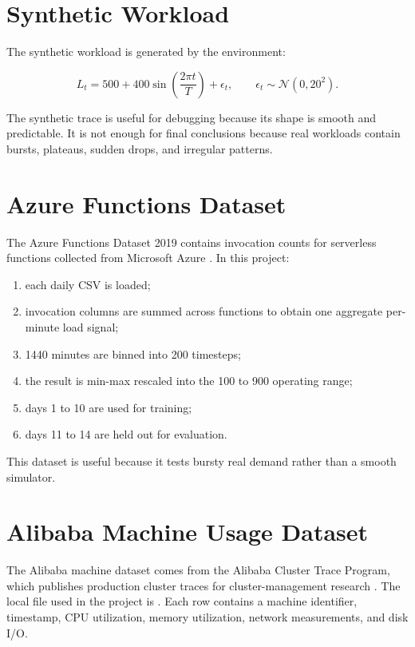\documentclass{rapportINPTCLOUD}
\newcommand{\pathcode}[1]{\texttt{\detokenize{#1}}}
\begin{document}
\section{Synthetic Workload}

The synthetic workload is generated by the environment:

\begin{equation}
L_t =
500
+ 400 \sin
\left(
\frac{2\pi t}{T}
\right)
+ \epsilon_t,
\qquad
\epsilon_t \sim \mathcal{N}(0,20^2).
\end{equation}

The synthetic trace is useful for debugging because its shape is smooth and predictable. It is not enough for final conclusions because real workloads contain bursts, plateaus, sudden drops, and irregular patterns.

\section{Azure Functions Dataset}

The Azure Functions Dataset 2019 contains invocation counts for serverless functions collected from Microsoft Azure \cite{azurefunctions}. In this project:

\begin{enumerate}
  \item each daily CSV is loaded;
  \item invocation columns are summed across functions to obtain one aggregate per-minute load signal;
  \item 1440 minutes are binned into 200 timesteps;
  \item the result is min-max rescaled into the 100 to 900 operating range;
  \item days 1 to 10 are used for training;
  \item days 11 to 14 are held out for evaluation.
\end{enumerate}

This dataset is useful because it tests bursty real demand rather than a smooth simulator.

\section{Alibaba Machine Usage Dataset}

The Alibaba machine dataset comes from the Alibaba Cluster Trace Program, which publishes production cluster traces for cluster-management research \cite{alibabaClusterData,alibabaTrace2018}. The local file used in the project is \pathcode{data/alibaba/machine_usage.csv}. Each row contains a machine identifier, timestamp, CPU utilization, memory utilization, network measurements, and disk I/O.
\end{document}
